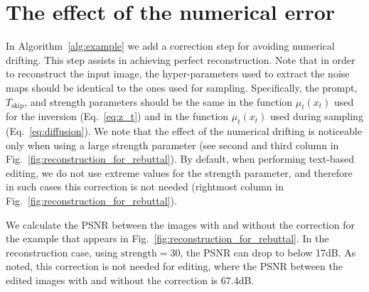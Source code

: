 \clearpage

\section{The effect of the numerical error} 
In Algorithm~\ref{alg:example} we add a correction step for avoiding numerical drifting. This step assists in achieving perfect reconstruction. Note that in order to reconstruct the input image, the hyper-parameters used to extract the noise maps should be identical to the ones used for sampling. Specifically, the prompt, $T_{\text{skip}}$, and strength parameters should be the same in the function $\mu_t(x_t)$ used for the inversion (Eq.~\ref{eq:z_t}) and in the function $\mu_t(x_t)$ used during sampling (Eq.~\ref{eq:diffusion}). We note that the effect of the numerical drifting is noticeable only when using a large strength parameter (see second and third column in Fig.~\ref{fig:reconstruction_for_rebuttal}). By default, when performing text-based editing, we do not use extreme values for the strength parameter, and therefore in such cases this correction is not needed (rightmost column in Fig.~\ref{fig:reconstruction_for_rebuttal}).


We calculate the PSNR between the images with and without the correction for the example that appears in Fig.~\ref{fig:reconstruction_for_rebuttal}. In the reconstruction case, using $\text{strength}=30$, the PSNR can drop to below 17dB. As noted, this correction is not needed for editing, where the PSNR between the edited images with and without the correction is 67.4dB.

